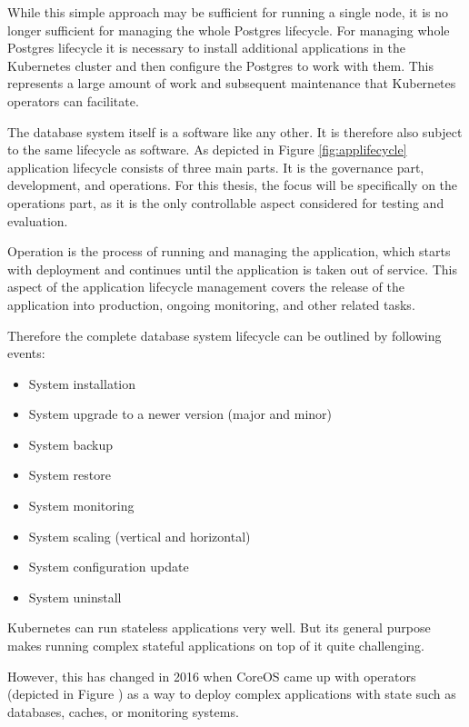 While this simple approach may be sufficient for running a single node, it is no longer sufficient for managing the whole Postgres lifecycle.
For managing whole Postgres lifecycle it is necessary to install additional applications in the Kubernetes cluster and then configure the Postgres to work with them. This represents a large amount of work and subsequent maintenance that Kubernetes operators can facilitate.

\label{chap:lifecycle}
The database system itself is a software like any other. It is therefore also subject to the same lifecycle as software.
As depicted in Figure \ref{fig:applifecycle} application lifecycle consists of three main parts. It is the governance part, development, and operations.
For this thesis, the focus will be specifically on the operations part, as it is the only controllable aspect considered for testing and evaluation.

Operation is the process of running and managing the application, which starts with deployment and continues until the application is taken out of service. This aspect of the application lifecycle management covers the release of the application into production, ongoing monitoring, and other related tasks. \cite{ALM}

Therefore the complete database system lifecycle can be outlined by following events:
\begin{itemize}
    \item System installation
    \item System upgrade to a newer version (major and minor)
    \item System backup
    \item System restore
    \item System monitoring
    \item System scaling (vertical and horizontal)
    \item System configuration update
    \item System uninstall
\end{itemize}

\pagebreak
{}
\label{chap:operators}
Kubernetes can run stateless applications very well. But its general purpose makes running complex stateful applications on top of it quite challenging.

However, this has changed in 2016 when CoreOS came up with operators (depicted in Figure ) as a way to deploy complex applications with state such as databases, caches, or monitoring systems. \cite{IArchiveCOSoperators}

